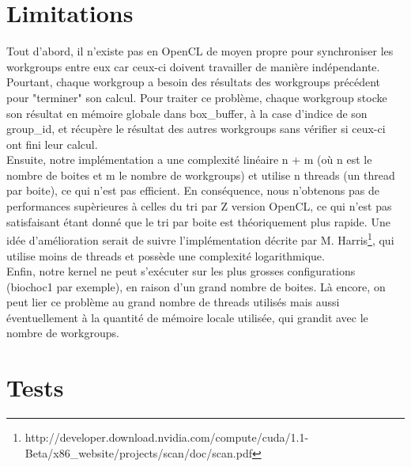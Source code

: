 \documentclass[]{article}
\begin{document}
\section{Limitations}

Tout d'abord, il n'existe pas en OpenCL de moyen propre pour synchroniser les workgroups entre eux car ceux-ci doivent travailler de manière indépendante. Pourtant, chaque workgroup a besoin des résultats des workgroups précédent pour "terminer" son calcul. Pour traiter ce problème, chaque workgroup stocke son résultat en mémoire globale dans box\_buffer, à la case d'indice de son group\_id, et récupère le résultat des autres workgroups sans vérifier si ceux-ci ont fini leur calcul. \\

Ensuite, notre implémentation a une complexité linéaire n + m (où n est le nombre de boites et m le nombre de workgroups) et utilise n threads (un thread par boite), ce qui n'est pas efficient. En conséquence, nous n'obtenons pas de performances supèrieures à celles du tri par Z version OpenCL, ce qui n'est pas satisfaisant étant donné que le tri par boite est théoriquement plus rapide. Une idée d'amélioration serait de suivre l'implémentation décrite par M. Harris\footnote{http://developer.download.nvidia.com/compute/cuda/1.1-Beta/x86\_website/projects/scan/doc/scan.pdf}, qui utilise moins de threads et possède une complexité logarithmique.\\

Enfin, notre kernel ne peut s'exécuter sur les plus grosses configurations (biochoc1 par exemple), en raison d'un grand nombre de boites. Là encore, on peut lier ce problème au grand nombre de threads utilisés mais aussi éventuellement à la quantité de mémoire locale utilisée, qui grandit avec le nombre de workgroups. 



\section{Tests}
\end{document}

